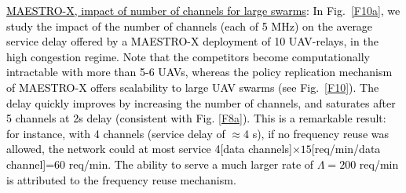 \documentclass[12pt, draftcls, onecolumn]{IEEEtran}
\theoremstyle{plain}
\theoremstyle{definition}
\theoremstyle{remark}
\newcommand\hlt[1]{\textcolor{black}{#1}}
\begin{document}
\noindent
\hlt{{\underline{MAESTRO-X, impact of number of channels for large swarms}}:  In Fig.~\ref{F10a}, we study the impact of the number of channels (each of 5 MHz) on the average service delay offered by a MAESTRO-X deployment of 10 UAV-relays, in the high congestion regime.
Note that the competitors become computationally intractable with more than 5-6 UAVs,
whereas the policy replication mechanism of MAESTRO-X offers scalability to large UAV swarms
(see Fig.~\ref{F10}). The delay quickly improves by increasing the number of channels, and saturates after 5 channels at 2s delay (consistent with Fig. \ref{F8a}). This is a remarkable result: for instance, with 4 channels (service delay of $\approx$4 s), if no frequency reuse was allowed, the network could at most service 4[data channels]$\times 15$[req/min/data channel]=60 req/min. The ability to serve a much larger rate of $\Lambda=200$ req/min is attributed to the frequency reuse mechanism.}
\end{document}
